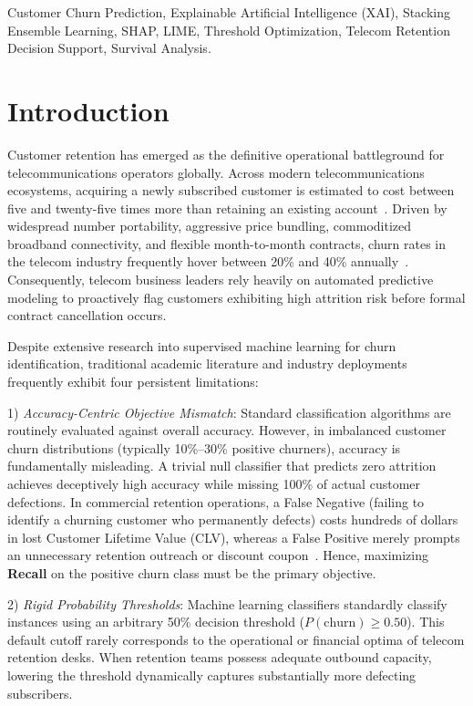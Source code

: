 \documentclass[conference]{IEEEtran}
\begin{document}
\begin{IEEEkeywords}
Customer Churn Prediction, Explainable Artificial Intelligence (XAI), Stacking Ensemble Learning, SHAP, LIME, Threshold Optimization, Telecom Retention Decision Support, Survival Analysis.
\end{IEEEkeywords}

\section{Introduction}
Customer retention has emerged as the definitive operational battleground for telecommunications operators globally. Across modern telecommunications ecosystems, acquiring a newly subscribed customer is estimated to cost between five and twenty-five times more than retaining an existing account~\cite{verbeke2012new}. Driven by widespread number portability, aggressive price bundling, commoditized broadband connectivity, and flexible month-to-month contracts, churn rates in the telecom industry frequently hover between 20\% and 40\% annually~\cite{amin2019customer, ullo2021churn}. Consequently, telecom business leaders rely heavily on automated predictive modeling to proactively flag customers exhibiting high attrition risk before formal contract cancellation occurs.

Despite extensive research into supervised machine learning for churn identification, traditional academic literature and industry deployments frequently exhibit four persistent limitations:

1) \textit{Accuracy-Centric Objective Mismatch}: Standard classification algorithms are routinely evaluated against overall accuracy. However, in imbalanced customer churn distributions (typically 10\%--30\% positive churners), accuracy is fundamentally misleading. A trivial null classifier that predicts zero attrition achieves deceptively high accuracy while missing 100\% of actual customer defections. In commercial retention operations, a False Negative (failing to identify a churning customer who permanently defects) costs hundreds of dollars in lost Customer Lifetime Value (CLV), whereas a False Positive merely prompts an unnecessary retention outreach or discount coupon~\cite{coussement2017churn}. Hence, maximizing \textbf{Recall} on the positive churn class must be the primary objective.

2) \textit{Rigid Probability Thresholds}: Machine learning classifiers standardly classify instances using an arbitrary 50\% decision threshold ($P(\text{churn}) \ge 0.50$). This default cutoff rarely corresponds to the operational or financial optima of telecom retention desks. When retention teams possess adequate outbound capacity, lowering the threshold dynamically captures substantially more defecting subscribers.
\end{document}
